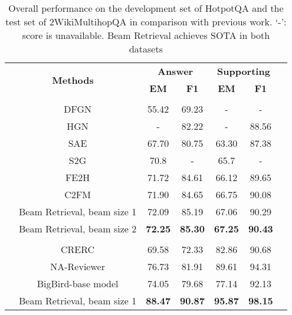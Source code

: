 \documentclass[10.5pt]{article}
\begin{document}
\begin{table*}[htb]
\centering
\begin{tabular}{cc|ccccc}
\hline
\multicolumn{2}{c|}{\multirow{2}{*}{\textbf{Methods}}}  & \multicolumn{2}{c}{\textbf{Answer}} & \multicolumn{2}{c}{\textbf{Supporting}} \\ \cline{3-6} 
\multicolumn{2}{c|}{}                             & \textbf{EM}    & \textbf{F1}    & \textbf{EM}    & \textbf{F1}   \\ \hline
\rowcolor{gray!10} \multicolumn{6}{c}{\textbf{\textsl{HotpotQA dev set}}} \\
\hline
                    & DFGN \cite{qiu-etal-2019-dynamically}                      & 55.42 & 69.23 & -  & -   \\
                    & HGN \cite{fang-etal-2020-hierarchical}                         &   -    &    82.22   & -      &  88.56        \\
                  & SAE \cite{DBLP:conf/aaai/TuHW0HZ20}                         & 67.70      & 80.75      &63.30       &87.38         \\
                   & S2G \cite{DBLP:journals/corr/abs-2107-11823}                         &      70.8 &      - &      65.7 &  -      \\
                & FE2H \cite{DBLP:journals/corr/abs-2205-11729}                        &      71.72 &  84.61     &  66.12     & 89.65         \\
                    & C2FM \cite{DBLP:journals/corr/abs-2212-09512}                        &      71.90 &     84.65  &   66.75    & 90.08         \\
                    & Beam Retrieval, beam size 1 & 72.09      &    85.19   &  67.06     &  90.29        \\
                    & Beam Retrieval, beam size 2 & \textbf{72.25} & \textbf{85.30} & \textbf{67.25}    &  \textbf{90.43}       \\ \hline
                    \rowcolor{gray!10} \multicolumn{6}{c}{\textbf{\textsl{2WikiHotpotQA test set}}} \\ \hline
 & CRERC \cite{CRERC}                      & 69.58 & 72.33 & 82.86  & 90.68   \\
                    & NA-Reviewer \cite{NA-Reviewer}                      &   76.73    & 81.91      &  89.61     &  94.31        \\
                    & BigBird-base model \cite{ho-etal-2023-analyzing}                         &  74.05     &   79.68    &  77.14     &  92.13        \\
                    & Beam Retrieval, beam size 1                        &   \textbf{88.47}    &    \textbf{90.87}   &   \textbf{95.87}    &  \textbf{98.15}        \\
                    \hline
\end{tabular}
\caption{Overall performance on the development set of HotpotQA and the test set of 2WikiMultihopQA in comparison with previous work. `-': score is unavailable. Beam Retrieval achieves SOTA in both datasets}
\label{tab:total_performance_HQ_2W}
\end{table*}
\end{document}
